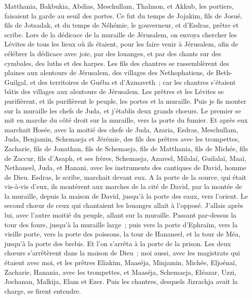 \begin{multicols}{2}
Matthania, Bakbukia, Abdias, Meschullam, Thalmon, et Akkub, les portiers, faisaient la garde au seuil des portes.
Ce fut du temps de Jojakim, fils de Josué, fils de Jotsadak, et du temps de Néhémie, le gouverneur, et d'Esdras, prêtre et scribe.
Lors de la dédicace de la muraille de Jérusalem, on envoya chercher les Lévites de tous les lieux où ils étaient, pour les faire venir à Jérusalem, afin de célébrer la dédicace avec joie, par des louanges, et par des chants sur des cymbales, des luths et des harpes.
Les fils des chantres se rassemblèrent des plaines aux alentours de Jérusalem, des villages des Nethophatiens,
de Beth-Guilgal, et des territoires de Guéba et d'Azmaveth~; car les chantres s'étaient bâtis des villages aux alentours de Jérusalem.
Les prêtres et les Lévites se purifièrent, et ils purifièrent le peuple, les portes et la muraille.
Puis je fis monter sur la muraille les chefs de Juda, et j'établis deux grands chœurs. Le premier se mit en marche du côté droit sur la muraille, vers la porte du fumier.
Et après eux marchait Hosée, avec la moitié des chefs de Juda,
Azaria, Esdras, Meschullam,
Juda, Benjamin, Schemaeja et Jérémie,
des fils des prêtres avec les trompettes, Zacharie, fils de Jonathan, fils de Schemaeja, fils de Matthania, fils de Michée, fils de Zaccur, fils d'Asaph,
et ses frères, Schemaeja, Azareel, Milalaï, Guilalaï, Maaï, Nethaneel, Juda, et Hanani, avec les instruments des cantiques de David, homme de Dieu. Esdras, le scribe, marchait devant eux.
A la porte de la source, qui était vis-à-vis d'eux, ils montèrent aux marches de la cité de David, par la montée de la muraille, depuis la maison de David, jusqu'à la porte des eaux, vers l'orient.
Le second chœur de ceux qui chantaient les louanges allait à l'opposé. J'allais après lui, avec l'autre moitié du peuple, allant sur la muraille. Passant par-dessus la tour des fours, jusqu'à la muraille large~;
puis vers la porte d'Ephraïm, vers la vieille porte, vers la porte des poissons, la tour de Hananeel, et la tour de Méa, jusqu'à la porte des brebis. Et l'on s'arrêta à la porte de la prison.
Les deux chœurs s'arrêtèrent dans la maison de Dieu~; moi aussi, avec les magistrats qui étaient avec moi,
et les prêtres Eliakim, Maaséja, Minjamin, Michée, Eljoénaï, Zacharie, Hanania, avec les trompettes,
et Maaséja, Schemaeja, Eléazar, Uzzi, Jochanan, Malkija, Elam et Ezer. Puis les chantres, desquels Jizrachja avait la charge, se firent entendre.

\end{multicols}
